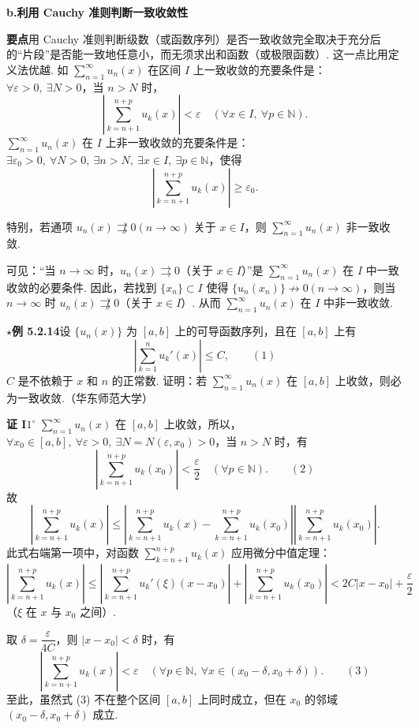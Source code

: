 \documentclass[UTF8,12pt,a4paper,fontset=fandol]{ctexart}
\begin{document}
\noindent\textbf{b.\quad 利用 Cauchy 准则判断一致收敛性}

\noindent\textbf{要点}\quad 用 Cauchy 准则判断级数（或函数序列）是否一致收敛完全取决于充分后的“片段”是否能一致地任意小，而无须求出和函数（或极限函数）. 这一点比用定义法优越. 如
$\displaystyle\sum_{n=1}^{\infty}u_n(x)$ 在区间 $I$ 上一致收敛的充要条件是：
$\forall\varepsilon>0,\ \exists N>0$，当 $n>N$ 时，
\[
  \left|\sum_{k=n+1}^{n+p}u_k(x)\right|<\varepsilon
  \quad(\forall x\in I,\ \forall p\in\mathbb N).
\]
$\displaystyle\sum_{n=1}^{\infty}u_n(x)$ 在 $I$ 上非一致收敛的充要条件是：
$\exists\varepsilon_0>0,\ \forall N>0,\ \exists n>N,\ \exists x\in I,\ \exists p\in\mathbb N$，使得
\[
  \left|\sum_{k=n+1}^{n+p}u_k(x)\right|\ge\varepsilon_0.
\]

特别，若通项 $u_n(x)\not\rightrightarrows0(n\to\infty)$ 关于 $x\in I$，则
$\displaystyle\sum_{n=1}^{\infty}u_n(x)$ 非一致收敛.

可见：“当 $n\to\infty$ 时，$u_n(x)\rightrightarrows0$（关于 $x\in I$）”是
$\displaystyle\sum_{n=1}^{\infty}u_n(x)$ 在 $I$ 中一致收敛的必要条件. 因此，若找到
$\{x_n\}\subset I$ 使得 $\{u_n(x_n)\}\not\to0(n\to\infty)$，则当 $n\to\infty$ 时
$u_n(x)\not\rightrightarrows0$（关于 $x\in I$）. 从而
$\displaystyle\sum_{n=1}^{\infty}u_n(x)$ 在 $I$ 中非一致收敛.

\noindent\textbf{$\star$例 5.2.14}\quad 设 $\{u_n(x)\}$ 为 $[a,b]$ 上的可导函数序列，且在
$[a,b]$ 上有
\[
  \left|\sum_{k=1}^n u_k'(x)\right|\le C,
\qquad(1)
\]
$C$ 是不依赖于 $x$ 和 $n$ 的正常数. 证明：若
$\displaystyle\sum_{n=1}^{\infty}u_n(x)$ 在 $[a,b]$ 上收敛，则必为一致收敛.（华东师范大学）

\noindent\textbf{证 I}\quad $1^\circ$ $\displaystyle\sum_{n=1}^{\infty}u_n(x)$ 在 $[a,b]$ 上收敛，所以，
$\forall x_0\in[a,b],\ \forall\varepsilon>0,\ \exists N=N(\varepsilon,x_0)>0$，当
$n>N$ 时，有
\[
  \left|\sum_{k=n+1}^{n+p}u_k(x_0)\right|<\frac{\varepsilon}{2}
  \quad(\forall p\in\mathbb N).
\qquad(2)
\]
故
\[
\left|\sum_{k=n+1}^{n+p}u_k(x)\right|
\le
\left|\sum_{k=n+1}^{n+p}u_k(x)-\sum_{k=n+1}^{n+p}u_k(x_0)\right|
\left|\sum_{k=n+1}^{n+p}u_k(x_0)\right|.
\]
此式右端第一项中，对函数 $\displaystyle\sum_{k=n+1}^{n+p}u_k(x)$ 应用微分中值定理：
\[
  \left|\sum_{k=n+1}^{n+p}u_k(x)\right|
  \le \left|\sum_{k=n+1}^{n+p}u_k'(\xi)(x-x_0)\right|
  +\left|\sum_{k=n+1}^{n+p}u_k(x_0)\right|
  <2C|x-x_0|+\frac{\varepsilon}{2}
\]
（$\xi$ 在 $x$ 与 $x_0$ 之间）.

取 $\delta=\dfrac{\varepsilon}{4C}$，则 $|x-x_0|<\delta$ 时，有
\[
  \left|\sum_{k=n+1}^{n+p}u_k(x)\right|<\varepsilon
  \quad(\forall p\in\mathbb N,\ \forall x\in(x_0-\delta,x_0+\delta)).
\qquad(3)
\]
至此，虽然式 (3) 不在整个区间 $[a,b]$ 上同时成立，但在 $x_0$ 的邻域
$(x_0-\delta,x_0+\delta)$ 成立.
\end{document}
